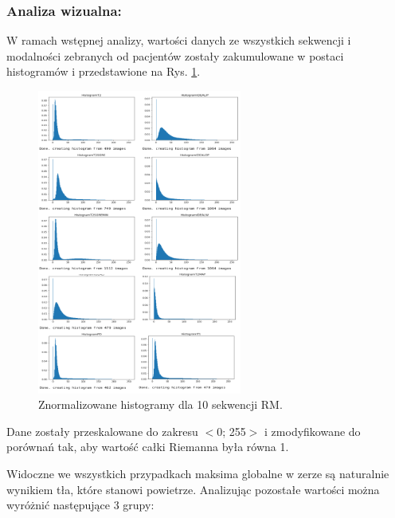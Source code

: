 \subsubsection{Analiza wizualna:} W ramach wstępnej analizy, wartości danych ze wszystkich sekwencji i modalności zebranych od pacjentów zostały zakumulowane w postaci  histogramów i przedstawione na Rys. \ref{fig:Hists}.
\begin{figure}[h]
	\centering
	\includegraphics[width=0.6\textwidth]{figures/Hists.png}
	\caption{Znormalizowane histogramy dla 10 sekwencji RM.}\label{fig:Hists}
\end{figure}
Dane zostały przeskalowane do zakresu $<$0; 255$>$ i zmodyfikowane do porównań tak, aby wartość całki Riemanna była równa 1.

Widoczne we wszystkich przypadkach maksima globalne w zerze są naturalnie wynikiem tła, które stanowi powietrze. Analizując pozostałe wartości można wyróżnić następujące 3 grupy:

